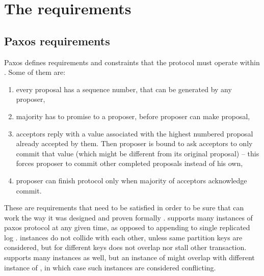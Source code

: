 
\section{The requirements}\label{sec:mpp:requirements}

\subsection{Paxos requirements}
Paxos defines requirements and constraints that the protocol must operate within \cite{lamport2001paxosMadeSimple}. Some of them are: \begin{enumerate}
  \item every proposal has a sequence number, that can be generated by any proposer,
  \item majority has to promise to a proposer, before proposer can make proposal,
  \item acceptors reply with a value associated with the highest numbered proposal already accepted by them. Then proposer is bound to ask acceptors to only commit that value (which might be different from its original proposal) -- this forces proposer to commit other completed proposals instead of his own,\label{sec:mpp:requirements:finishInProgress}
  \item proposer can finish protocol only when majority of acceptors acknowledge commit.
\end{enumerate}
These are requirements that need to be satisfied in order to be sure that \paxos can work the way it was designed and proven formally \cite{Lamport1998partTimeParliment}. 
\lwt supports many instances of paxos protocol at any given time, as opposed to appending to single replicated log \cite{chandra2007PaxosMadeLive}. \lwt instances do not collide with each other, unless same partition keys are considered, but \lwt for different keys does not overlap nor stall other \lwt transaction.
\mpt supports many instances as well, but an instance of \mpt might overlap with different instance of \mpt, in which case such instances are considered conflicting. 

